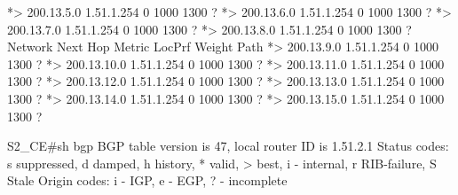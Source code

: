 \documentclass[10pt]{article}
\begin{document}
\begin{itemize}
\begin{verbatim*}
		*> 200.13.5.0       1.51.1.254                             0 1000 1300 ?
		*> 200.13.6.0       1.51.1.254                             0 1000 1300 ?
		*> 200.13.7.0       1.51.1.254                             0 1000 1300 ?
		*> 200.13.8.0       1.51.1.254                             0 1000 1300 ?
		   Network          Next Hop            Metric LocPrf Weight Path
		*> 200.13.9.0       1.51.1.254                             0 1000 1300 ?
		*> 200.13.10.0      1.51.1.254                             0 1000 1300 ?
		*> 200.13.11.0      1.51.1.254                             0 1000 1300 ?
		*> 200.13.12.0      1.51.1.254                             0 1000 1300 ?
		*> 200.13.13.0      1.51.1.254                             0 1000 1300 ?
		*> 200.13.14.0      1.51.1.254                             0 1000 1300 ?
		*> 200.13.15.0      1.51.1.254                             0 1000 1300 ?


		S2_CE#sh bgp
		BGP table version is 47, local router ID is 1.51.2.1
		Status codes: s suppressed, d damped, h history, * valid, > best, i - internal,
		              r RIB-failure, S Stale
		Origin codes: i - IGP, e - EGP, ? - incomplete


\end{verbatim*}
\end{itemize}
\end{document}
